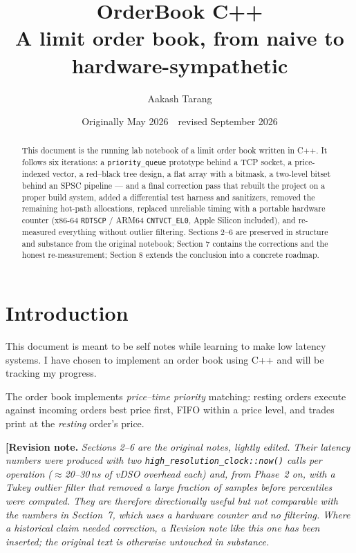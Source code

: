 \documentclass[11pt,a4paper]{article}
\title{OrderBook C++\\[4pt]
\large A limit order book, from naive to hardware-sympathetic}
\author{Aakash Tarang}
\date{Originally May 2026 \,\textperiodcentered\, revised September 2026}
\newenvironment{revision}{\par\medskip\noindent\textbf{[Revision note.} \itshape}{\normalfont\par\rmfamily\medskip}
\begin{document}
\maketitle

\begin{abstract}
This document is the running lab notebook of a limit order book written in
C++. It follows six iterations: a \texttt{priority\_queue} prototype behind a
TCP socket, a price-indexed vector, a red--black tree design, a flat array
with a bitmask, a two-level bitset behind an SPSC pipeline --- and a final
correction pass that rebuilt the project on a proper build system, added a
differential test harness and sanitizers, removed the remaining hot-path
allocations, replaced unreliable timing with a portable hardware counter
(x86-64 \texttt{RDTSCP} / ARM64 \texttt{CNTVCT\_EL0}, Apple Silicon
included), and re-measured everything without outlier filtering. Sections
2--6 are preserved in structure and substance from the original notebook;
Section 7 contains the corrections and the honest re-measurement; Section 8
extends the conclusion into a concrete roadmap.
\end{abstract}

\tableofcontents

\section{Introduction}\label{sec:intro}

This document is meant to be self notes while learning to make low latency
systems. I have chosen to implement an order book using C++ and will be
tracking my progress.

The order book implements \emph{price--time priority} matching: resting
orders execute against incoming orders best price first, FIFO within a
price level, and trades print at the \emph{resting} order's price.

\begin{revision}
Sections 2--6 are the original notes, lightly edited. Their latency numbers
were produced with two \texttt{high\_resolution\_clock::now()} calls per
operation ($\approx$20--30\,ns of vDSO overhead each) and, from Phase~2 on,
with a Tukey outlier filter that removed a large fraction of samples before
percentiles were computed. They are therefore \emph{directionally} useful
but not comparable with the numbers in Section~7, which uses a hardware
counter and no filtering. Where a historical claim needed correction, a
\emph{Revision note} like this one has been inserted; the original text is
otherwise untouched in substance.
\end{revision}
\end{document}
